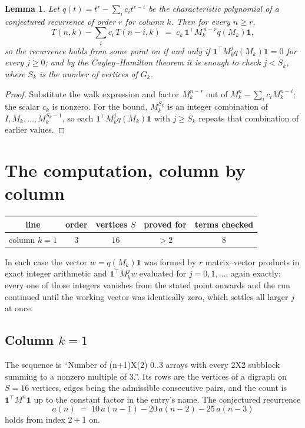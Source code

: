 \documentclass[11pt,a4paper]{article}
\theoremstyle{plain}
\newtheorem{lemma}[theorem]{Lemma}
\theoremstyle{definition}
\begin{document}
\begin{lemma}\label{lem:crit}
Let $q(t)=t^{r}-\sum_i c_it^{r-i}$ be the characteristic polynomial of a conjectured
recurrence of order $r$ for column $k$. Then for every $n\ge r$,
\[
T(n,k)-\sum_i c_i\,T(n-i,k)\;=\;c_k\,\mathbf{1}^{\!\top}M_k^{\,n-r}q(M_k)\mathbf{1},
\]
so the recurrence holds from some point on if and only if
$\mathbf{1}^{\!\top}M_k^{j}q(M_k)\mathbf{1}=0$ for every $j\ge0$; and by the
Cayley--Hamilton theorem it is enough to check $j<S_k$, where $S_k$ is the number of vertices
of $G_k$.
\end{lemma}

\begin{proof}
Substitute the walk expression and factor $M_k^{n-r}$ out of $M_k^{n}-\sum_ic_iM_k^{n-i}$;
the scalar $c_k$ is nonzero. For the bound, $M_k^{S_k}$ is an integer combination of
$I,M_k,\dots,M_k^{S_k-1}$, so each $\mathbf{1}^{\!\top}M_k^{j}q(M_k)\mathbf{1}$ with
$j\ge S_k$ repeats that combination of earlier values.
\end{proof}

\section{The computation, column by column}

\begin{center}
\begin{tabular}{ccccc}
line & order & vertices $S$ & proved for & terms checked \\ \hline
column $k$$=1$ & $3$ & $16$ & $>2$ & $8$ \\
\end{tabular}
\end{center}

In each case the vector $w=q(M_k)\mathbf{1}$ was formed by $r$ matrix--vector products in
exact integer arithmetic and $\mathbf{1}^{\!\top}M_k^{j}w$ evaluated for $j=0,1,\dots$,
again exactly; every one of those integers vanishes from the stated point onwards and the run
continued until the working vector was identically zero, which settles all larger $j$ at once.

\subsection*{Column $k$$=1$}
The sequence is ``Number of (n+1)X(2) 0..3 arrays with every 2X2 subblock summing to a nonzero multiple of 3.''. Its rows are the vertices of a digraph on
$S=16$ vertices, edges being the admissible consecutive pairs, and the count is
$\mathbf{1}^{\!\top}M^{n}\mathbf{1}$ up to the constant factor in the entry's name.
The conjectured recurrence
\[
a(n)\;=\;10\,a(n-1) - 20\,a(n-2) - 25\,a(n-3)
\]
holds from index $2+1$ on.
\end{document}
